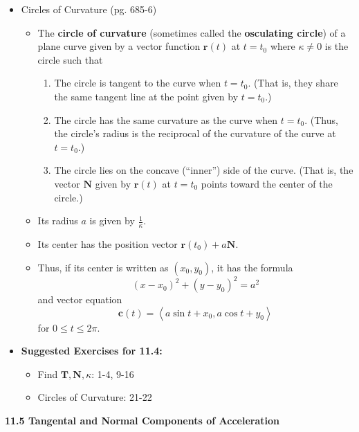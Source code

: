 \documentclass[12pt]{article}
\theoremstyle{plain}
\theoremstyle{definition}
\theoremstyle{remark}
\newcommand{\vect}[1]{\mathbf{#1}}
\begin{document}
\begin{itemize}
	\item Circles of Curvature (pg. 685-6)
	
		\begin{itemize}
		\item The \textbf{circle of curvature} (sometimes called the \textbf{osculating circle}) of a plane curve given by a vector function $\vect{r}(t)$ at $t=t_0$ where $\kappa\not=0$ is the circle such that
			\begin{enumerate}
			\item The circle is tangent to the curve when $t=t_0$. (That is, they share the same tangent line at the point given by $t=t_0$.)
			\item The circle has the same curvature as the curve when $t=t_0$. (Thus, the circle's radius is the reciprocal of the curvature of the curve at $t=t_0$.)
			\item The circle lies on the concave (``inner'') side of the curve. (That is, the vector $\vect{N}$ given by $\vect{r}(t)$ at $t=t_0$ points toward the center of the circle.)
			\end{enumerate}
		\item Its radius $a$ is given by $\displaystyle\frac{1}{\kappa}$.
		\item Its center has the position vector $\vect{r}(t_0)+a\vect{N}$.
		\item Thus, if its center is written as $(x_0,y_0)$, it has the formula \[(x-x_0)^2+(y-y_0)^2=a^2\] and vector equation \[\vect{c}(t) = \left<a\sin t+x_0,a\cos t+y_0\right>\] for $0\leq t\leq 2\pi$.
		\end{itemize}
		
	\item \textbf{ Suggested Exercises for 11.4:}
	
		\begin{itemize}
		\item Find $\vect{T},\vect{N},\kappa$: 1-4, 9-16
		\item Circles of Curvature: 21-22
		\end{itemize}
		
	\end{itemize}
	
	\newpage
	
	\centerline{\bf 11.5 Tangental and Normal Components of Acceleration}
	
\end{document}
